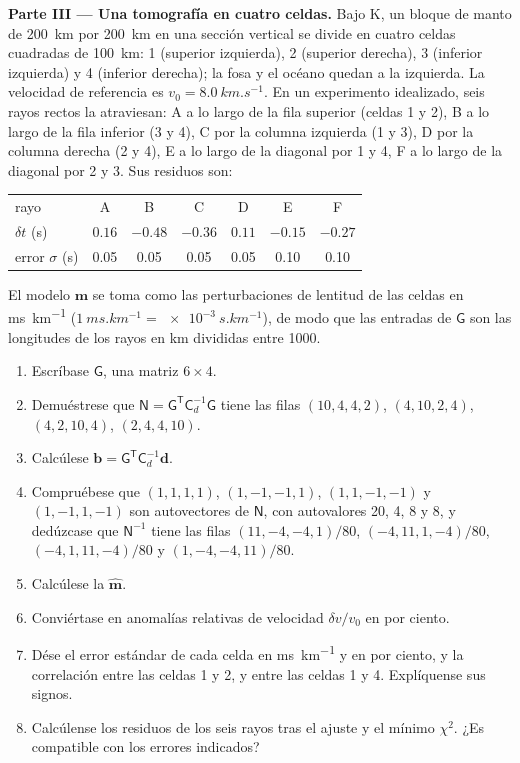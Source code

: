 \begin{problem}
\noindent\textbf{Parte III --- Una tomografía en cuatro celdas.} Bajo K, un bloque de
manto de \qty{200}{km} por \qty{200}{km} en una sección vertical se divide en cuatro
celdas cuadradas de \qty{100}{km}: 1 (superior izquierda), 2 (superior derecha), 3 (inferior izquierda)
y 4 (inferior derecha); la fosa y el océano quedan a la izquierda. La velocidad de referencia es $v_0 = \qty{8.0}{km.s^{-1}}$. En un
experimento idealizado, seis rayos rectos la atraviesan: A a lo largo de la fila superior (celdas 1
y 2), B a lo largo de la fila inferior (3 y 4), C por la columna izquierda (1 y 3), D
por la columna derecha (2 y 4), E a lo largo de la diagonal por 1 y 4, F a lo largo de
la diagonal por 2 y 3. Sus residuos son:
\begin{center}
\small
\begin{tabular}{lcccccc}
\hline
rayo & A & B & C & D & E & F \\
$\delta t$ (\unit{s}) & $0.16$ & $-0.48$ & $-0.36$ & $0.11$ & $-0.15$ & $-0.27$ \\
error $\sigma$ (\unit{s}) & 0.05 & 0.05 & 0.05 & 0.05 & 0.10 & 0.10 \\
\hline
\end{tabular}
\end{center}
El modelo $\mathbf m$ se toma como las perturbaciones de lentitud de las celdas en
\unit{ms.km^{-1}} ($\qty{1}{ms.km^{-1}} = \qty{e-3}{s.km^{-1}}$), de modo que las
entradas de $\mathsf G$ son las longitudes de los rayos en \unit{km} divididas entre 1000.
\begin{enumerate}[resume]
  \item Escríbase $\mathsf G$, una matriz $6\times4$.
  \item Demuéstrese que $\mathsf N = \mathsf G^{\mathsf T}\mathsf C_d^{-1}\mathsf G$
        tiene las filas $(10, 4, 4, 2)$, $(4, 10, 2, 4)$, $(4, 2, 10, 4)$,
        $(2, 4, 4, 10)$.
  \item Calcúlese $\mathbf b = \mathsf G^{\mathsf T}\mathsf C_d^{-1}\mathbf d$.
  \item Compruébese que $(1,1,1,1)$, $(1,-1,-1,1)$, $(1,1,-1,-1)$ y $(1,-1,1,-1)$
        son autovectores de $\mathsf N$, con autovalores 20, 4, 8 y 8, y
        dedúzcase que $\mathsf N^{-1}$ tiene las filas $(11, -4, -4, 1)/80$,
        $(-4, 11, 1, -4)/80$, $(-4, 1, 11, -4)/80$ y $(1, -4, -4, 11)/80$.
  \item Calcúlese la  $\hat{\mathbf m}$.
  \item Conviértase en anomalías relativas de velocidad $\delta v/v_0$ en por ciento.
  \item Dése el error estándar de cada celda en \unit{ms.km^{-1}} y en por
        ciento, y la correlación entre las celdas 1 y 2, y entre las celdas 1
        y 4. Explíquense sus signos.
  \item Calcúlense los residuos de los seis rayos tras el ajuste y el mínimo
        $\chi^2$. ¿Es compatible con los errores indicados?
\end{enumerate}


\end{problem}
